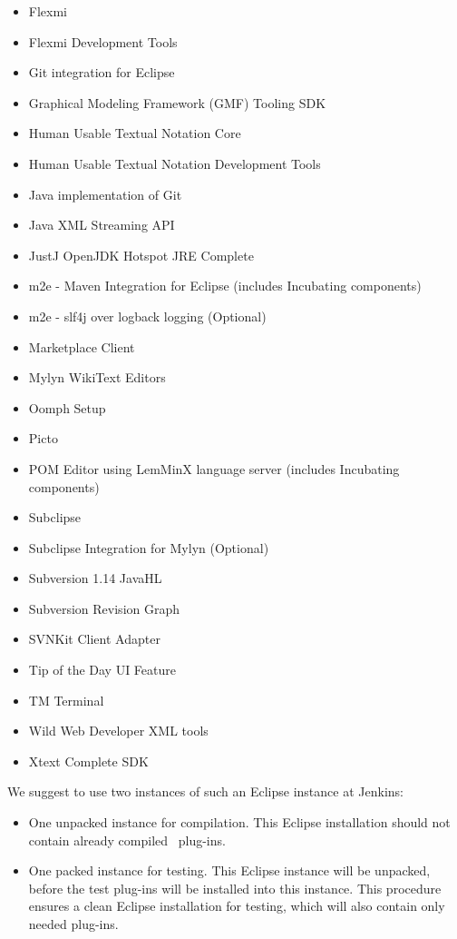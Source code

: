 \begin{itemize}
  \item Flexmi
  \item Flexmi Development Tools
  \item Git integration for Eclipse
  \item Graphical Modeling Framework (GMF) Tooling SDK
  \item Human Usable Textual Notation Core
  \item Human Usable Textual Notation Development Tools
  \item Java implementation of Git
  \item Java XML Streaming API
  \item JustJ OpenJDK Hotspot JRE Complete
  \item m2e - Maven Integration for Eclipse (includes Incubating components)
  \item m2e - slf4j over logback logging (Optional)
  \item Marketplace Client
  \item Mylyn WikiText Editors
  \item Oomph Setup
  \item Picto
  \item POM Editor using LemMinX language server (includes Incubating components)
  \item Subclipse
  \item Subclipse Integration for Mylyn (Optional)
  \item Subversion 1.14 JavaHL
  \item Subversion Revision Graph
  \item SVNKit Client Adapter
  \item Tip of the Day UI Feature
  \item TM Terminal
  \item Wild Web Developer XML tools
  \item Xtext Complete SDK
\end{itemize}

We suggest to use two instances of such an Eclipse instance at Jenkins:
\begin{itemize}
	\item One unpacked instance for compilation. This Eclipse installation should not contain already compiled \EASy\ plug-ins.
	\item One packed instance for testing. This Eclipse instance will be unpacked, before the test plug-ins will be installed into this instance. This procedure ensures a clean Eclipse installation for testing, which will also contain only needed \EASy plug-ins.
\end{itemize}

